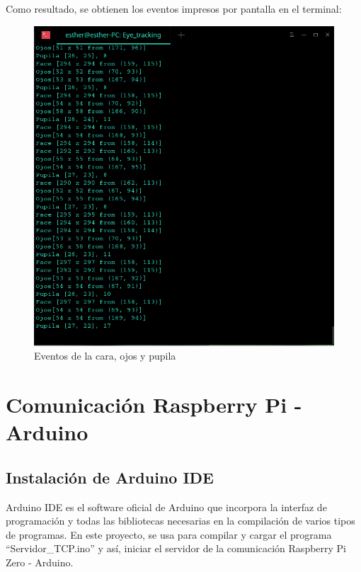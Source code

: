 Como resultado, se obtienen los eventos impresos por pantalla en el terminal:

    \begin{figure}
    \centering
    \includegraphics[scale = 0.5]{capitulo_04/figuras_dir/eventos.jpg}
    \caption{Eventos de la cara, ojos y pupila}
    \end{figure}


\section{Comunicación Raspberry Pi - Arduino} \label{s4_4}

\subsection{Instalación de Arduino IDE} \label{s4_4_1}

Arduino IDE es el software oficial de Arduino que incorpora la interfaz de programación y todas las bibliotecas necesarias en la compilación de varios tipos de programas. En este proyecto, se usa para compilar y cargar el programa ``Servidor\_TCP.ino'' y así, iniciar el servidor de la comunicación Raspberry Pi Zero - Arduino.

